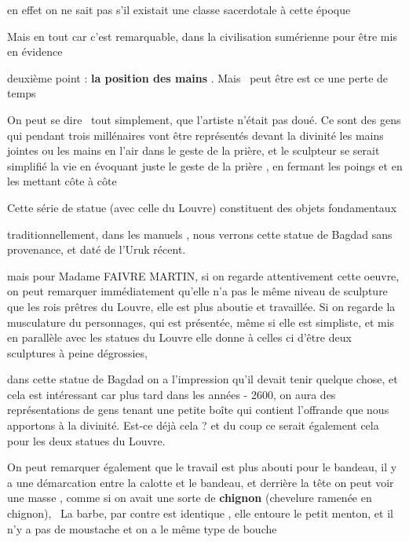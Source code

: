 \documentclass[a4paper]{article}
\begin{document}
{
en effet on ne sait pas s'il existait une classe sacerdotale à cette époque}


\bigskip

{
Mais en tout car c'est remarquable, dans la civilisation sumérienne pour être mis en évidence}


\bigskip


\bigskip

{
deuxième point : \textbf{la position des mains} . Mais \ peut être est ce une perte de temps}

{
On peut se dire \ tout simplement, que l'artiste n'était pas doué. Ce sont des gens qui pendant trois millénaires vont
être représentés devant la divinité les mains jointes ou les mains en l'air dans le geste de la prière, et le sculpteur
se serait simplifié la vie en évoquant juste le geste de la prière , en fermant les poings et en les mettant côte à
côte}

{
Cette série de statue (avec celle du Louvre) constituent des objets fondamentaux}


\bigskip

{
traditionnellement, dans les manuels , nous verrons cette statue de Bagdad sans provenance, et daté de l'Uruk récent.}

{
mais pour Madame FAIVRE MARTIN, si on regarde attentivement cette oeuvre, on peut remarquer immédiatement qu'elle n'a
pas le même niveau de sculpture que les rois prêtres du Louvre, elle est plus aboutie et travaillée. Si on regarde la
musculature du personnages, qui est présentée, même si elle est simpliste, et mis en parallèle avec les statues du
Louvre elle donne à celles ci d'être deux sculptures à peine dégrossies, \ }

{
dans cette statue de Bagdad on a l'impression qu'il devait tenir quelque chose, et cela est intéressant car plus tard
dans les années - 2600, on aura des représentations de gens tenant une petite boîte qui contient l'offrande que nous
apportons à la divinité. Est-ce déjà cela ? et du coup ce serait également cela pour les deux statues du Louvre.}


\bigskip


\bigskip


\bigskip

{
On peut remarquer également que le travail est plus abouti pour le bandeau, il y a une démarcation entre la calotte et
le bandeau, et derrière la tête on peut voir une masse , comme si on avait une sorte de \textbf{chignon }(chevelure
ramenée en chignon), \ La barbe, par contre est identique , elle entoure le petit menton, et il n'y a pas de moustache
et on a le même type de bouche}
\end{document}
